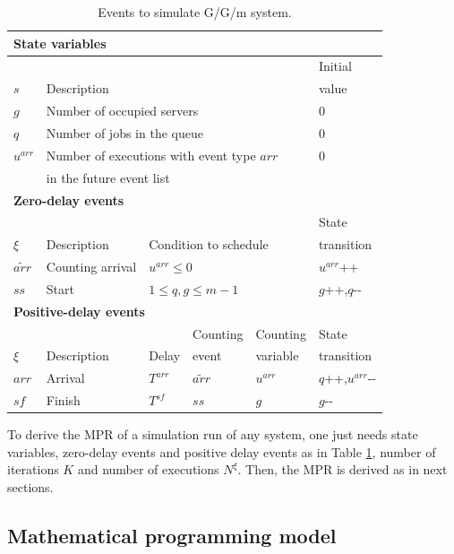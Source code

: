\documentclass[]{interact}
\theoremstyle{plain}%
\theoremstyle{definition}
\theoremstyle{remark}
\begin{document}
\renewcommand\arraystretch{1.2}
\begin{table}[h]
	\begin{tabular}{llllll}
		\multicolumn{6}{l}{\textbf{State variables}}\\ \hline
		 &&&&& Initial\\
		$s$ & \multicolumn{4}{l}{Description}& value\\\hline
		$g$& \multicolumn{4}{l}{Number of occupied servers}  & 0 \\
		$q$ & \multicolumn{4}{l}{Number of jobs in the queue} &0\\
		$u^{arr}$& \multicolumn{4}{l}{Number of executions with event type $arr$ }  &0\\
					&\multicolumn{4}{l}{in the future event list}& \\
		\multicolumn{6}{l}{\textbf{Zero-delay events}}\\ \hline
		 &&&&& State\\
		$\xi$&Description &  \multicolumn{3}{l}{Condition to schedule}& transition\\\hline%
		${\tilde{arr}}$ & Counting arrival&  \multicolumn{3}{l}{$u^{arr}\le0$} & $u^{arr}${\footnotesize++} \\
		${ss}$& Start 	& \multicolumn{3}{l}{$1\le q, g\le m-1$} & $g${\footnotesize++},$q${\small-}{\small-}  \\
		\multicolumn{6}{l}{\textbf{Positive-delay events}}\\ \hline
		&&& Counting& Counting  & State \\
		$\xi$&Description & Delay &  event& variable & transition\\\hline
		${arr}$& Arrival & $T^{arr}$& ${\tilde{arr}}$& $u^{arr}$ & $q${\footnotesize++},$u^{arr}${\small-}{\small-} \\	
		${sf}$& Finish & $T^{sf}$& ${ss}$& $g$  & $g${\small-}{\small-} \\\hline
	\end{tabular}
	\caption{Events to simulate G/G/m system.}
	\label{tab:ggm_1}
\end{table}

To derive the MPR of a simulation run of any system, one just needs state variables, zero-delay events and positive delay events as in Table \ref{tab:ggm_1}, number of iterations $K$ and number of executions $N^{\xi}$. Then, the MPR is derived as in next sections.

\subsection{Mathematical programming model}
\end{document}
